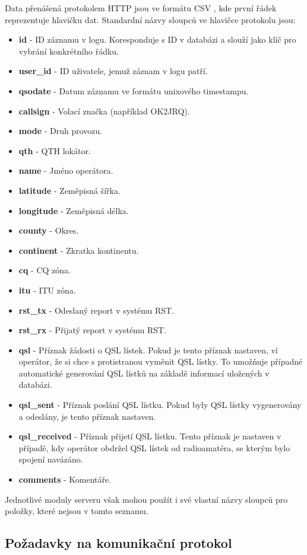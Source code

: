 Data přenášená protokolem HTTP jsou ve formátu CSV \cite{csv}, kde první řádek reprezentuje hlavičku dat. Standardní názvy
sloupců ve hlavičce protokolu jsou:
\begin{itemize}
\item \textbf{id} - ID záznamu v logu. Koresponduje s ID v databázi a slouží jako klíč pro vybrání konkrétního řádku.
\item \textbf{user\_id} - ID uživatele, jemuž záznam v logu patří.
\item \textbf{qsodate} - Datum záznamu ve formátu unixového timestampu.
\item \textbf{callsign} - Volací značka (například OK2JRQ).
\item \textbf{mode} - Druh provozu. %
\item \textbf{qth} - QTH lokátor.
\item \textbf{name} - Jméno operátora.
\item \textbf{latitude} - Zeměpisná šířka.
\item \textbf{longitude} - Zeměpisná délka.
\item \textbf{county} - Okres.
\item \textbf{continent} - Zkratka kontinentu.
\item \textbf{cq} - CQ zóna.
\item \textbf{itu} - ITU zóna.
\item \textbf{rst\_tx} - Odeslaný report v systému RST.
\item \textbf{rst\_rx} - Přijatý report v systému RST.
\item \textbf{qsl} - Příznak žádosti o QSL lístek. Pokud je tento příznak nastaven, ví operátor, že si chce
s protistranou vyměnit QSL lístky. To umožňuje případné automatické generování QSL lístků na základě informací
uložených v databázi.
\item \textbf{qsl\_sent} - Příznak poslání QSL lístku. Pokud byly QSL lístky vygenerovány a odeslány, je tento
příznak nastaven.
\item \textbf{qsl\_received} - Příznak přijetí QSL lístku. Tento příznak je nastaven v případě, kdy operátor
obdržel QSL lístek od radioamatéra, se kterým bylo spojení navázáno.
\item \textbf{comments} - Komentáře.
\end{itemize}

Jednotlivé moduly serveru však mohou použít i své vlastní názvy sloupců pro položky, které nejsou v tomto seznamu.

\subsection{Požadavky na komunikační protokol}

